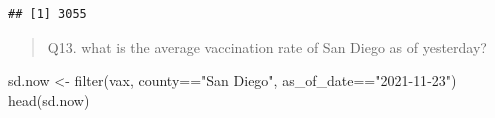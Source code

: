 \documentclass[
]{article}
\newenvironment{Shaded}{\begin{snugshade}}{\end{snugshade}}
\newcommand{\FunctionTok}[1]{\textcolor[rgb]{0.00,0.00,0.00}{#1}}
\newcommand{\NormalTok}[1]{#1}
\newcommand{\OtherTok}[1]{\textcolor[rgb]{0.56,0.35,0.01}{#1}}
\newcommand{\SpecialCharTok}[1]{\textcolor[rgb]{0.00,0.00,0.00}{#1}}
\newcommand{\StringTok}[1]{\textcolor[rgb]{0.31,0.60,0.02}{#1}}
\begin{document}
\begin{verbatim}
## [1] 3055
\end{verbatim}

\begin{quote}
Q13. what is the average vaccination rate of San Diego as of yesterday?
\end{quote}

\begin{Shaded}
\begin{Highlighting}[]
\NormalTok{sd.now }\OtherTok{\textless{}{-}} \FunctionTok{filter}\NormalTok{(vax, county}\SpecialCharTok{==}\StringTok{"San Diego"}\NormalTok{,}
\NormalTok{                 as\_of\_date}\SpecialCharTok{==}\StringTok{"2021{-}11{-}23"}\NormalTok{)}
\FunctionTok{head}\NormalTok{(sd.now)}
\end{Highlighting}
\end{Shaded}
\end{document}
